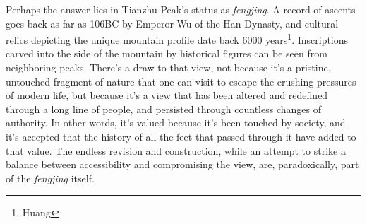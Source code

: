 Perhaps the answer lies in Tianzhu Peak's status as \textit{fengjing}. A record
of ascents goes back as far as 106BC by Emperor Wu of the Han Dynasty, and
cultural relics depicting the unique mountain profile date back 6000
years\footnote{Huang}. Inscriptions carved into the side of the mountain by
historical figures can be seen from neighboring peaks. There's a draw to that
view, not because it's a pristine, untouched fragment of nature that one can
visit to escape the crushing pressures of modern life, but because it's a view
that has been altered and redefined through a long line of people, and persisted
through countless changes of authority. In other words, it's valued because it's
been touched by society, and it's accepted that the history of all the feet that
passed through it have added to that value. The endless revision and
construction, while an attempt to strike a balance between accessibility and
compromising the view, are, paradoxically, part of the \textit{fengjing} itself.
